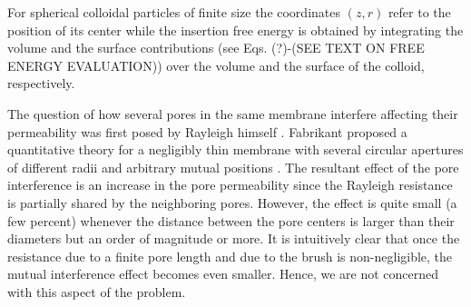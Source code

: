 For spherical colloidal particles of finite size the coordinates $(z,r)$ refer to the position of its center while the insertion free energy is obtained by integrating the volume and the surface contributions (see Eqs. (?)-(SEE TEXT ON FREE ENERGY EVALUATION))  over the volume and the surface of the colloid, respectively.

The question of how several pores in the same membrane interfere affecting their permeability was first posed by Rayleigh himself \cite{Strutt1878}. Fabrikant  proposed a quantitative theory for a negligibly thin membrane with several circular apertures of different radii and arbitrary mutual positions \cite{Fabrikant1985}. The resultant effect of the pore interference is an increase in the pore permeability since the Rayleigh resistance is partially shared by the neighboring pores. However, the effect is quite small (a few percent) whenever the distance between the pore centers is larger than their diameters but an order of magnitude or more. It is intuitively clear that once the resistance due to a finite pore length and due to the brush is non-negligible, the mutual interference effect becomes even smaller. Hence, we are not concerned with this aspect of the problem.
